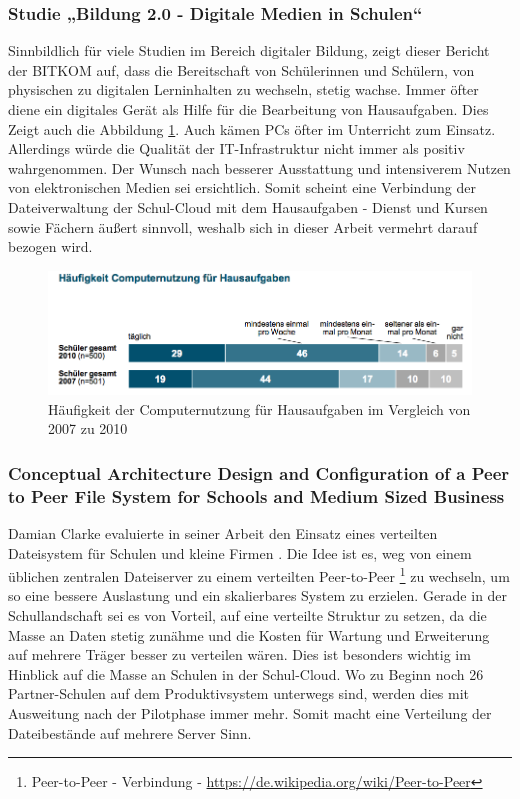 \subsubsection{Studie „Bildung 2.0 - Digitale Medien in Schulen“}

Sinnbildlich für viele Studien im Bereich digitaler Bildung, zeigt dieser Bericht der BITKOM \cite{paper:studiebildung20} auf, dass die Bereitschaft von Schülerinnen und Schülern, von physischen zu digitalen Lerninhalten zu wechseln, stetig wachse. Immer öfter diene ein digitales Gerät als Hilfe für die Bearbeitung von Hausaufgaben. Dies Zeigt auch die Abbildung \ref{fig:BitkomNutzungComputerStudie}. Auch kämen PCs öfter im Unterricht zum Einsatz. Allerdings würde die Qualität der IT-Infrastruktur nicht immer als positiv wahrgenommen. Der Wunsch nach besserer Ausstattung und intensiverem Nutzen von elektronischen Medien sei ersichtlich. Somit scheint eine Verbindung der Dateiverwaltung der Schul-Cloud mit dem Hausaufgaben - Dienst und Kursen sowie Fächern äußert sinnvoll, weshalb sich in dieser Arbeit vermehrt darauf bezogen wird.

\begin{figure}[H]
	\centering
	\includegraphics[width=0.8\linewidth]{images/BitkomNutzungComputerStudie}
	\caption[Caption for relatedWork]{Häufigkeit der Computernutzung für Hausaufgaben im Vergleich von 2007 zu 2010\footnotemark}
	\label{fig:BitkomNutzungComputerStudie}
\end{figure}

\subsubsection{Conceptual Architecture Design and Configuration of a Peer to Peer File System for Schools and Medium Sized Business}

Damian Clarke evaluierte in seiner Arbeit den Einsatz eines verteilten Dateisystem für Schulen und kleine Firmen \cite{paper:p2pfilesystemclarke}. Die Idee ist es, weg von einem üblichen zentralen Dateiserver zu einem verteilten Peer-to-Peer \footnote{Peer-to-Peer - Verbindung - \url{https://de.wikipedia.org/wiki/Peer-to-Peer}} zu wechseln, um so eine bessere Auslastung und ein skalierbares System zu erzielen. Gerade in der Schullandschaft sei es von Vorteil, auf eine verteilte Struktur zu setzen, da die Masse an Daten stetig  zunähme und die Kosten für Wartung und Erweiterung auf mehrere Träger besser zu verteilen wären. Dies ist besonders wichtig im Hinblick auf die Masse an Schulen in der Schul-Cloud. Wo zu Beginn noch 26 Partner-Schulen auf dem Produktivsystem unterwegs sind, werden dies mit Ausweitung nach der Pilotphase immer mehr. Somit macht eine Verteilung der Dateibestände auf mehrere Server Sinn.

